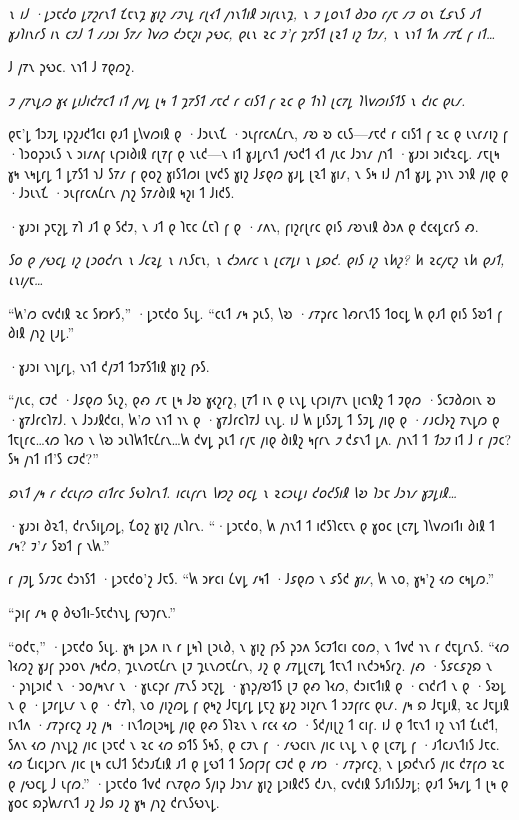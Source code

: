 \emph{𐑯 𐑦𐑓 ·𐑛𐑮𐑱𐑒𐑴 𐑛𐑳𐑟𐑩𐑯𐑑 𐑗𐑱𐑯𐑡 𐑣𐑦𐑟 𐑥𐑲𐑯𐑛 𐑩𐑚𐑬𐑑 𐑢𐑪𐑯𐑑𐑦𐑙 𐑮𐑦𐑝𐑧𐑯𐑡, 𐑯 𐑲 𐑛𐑴𐑯𐑑 𐑔𐑮𐑴 𐑩𐑢𐑱 𐑥𐑲 𐑴𐑯 𐑗𐑭𐑯𐑕 𐑨𐑑 𐑣𐑨𐑐𐑦𐑯𐑩𐑕 𐑦𐑯 𐑤𐑲𐑓 𐑑 𐑥𐑨𐑮𐑦 𐑕𐑳𐑥 𐑐𐑫𐑼 𐑒𐑮𐑱𐑟𐑦 𐑜𐑻𐑤, 𐑞𐑧𐑯 𐑷𐑤 𐑲'𐑝 𐑡𐑳𐑕𐑑 𐑚𐑷𐑑 𐑦𐑟 𐑑𐑲𐑥, 𐑯 𐑯𐑪𐑑 𐑑𐑵 𐑥𐑳𐑗 𐑝 𐑦𐑑…}

𐑓 𐑢𐑳𐑯 𐑜𐑻𐑤. 𐑯𐑪𐑑 𐑓 𐑳𐑞𐑼𐑟.

\emph{𐑲 𐑢𐑳𐑯𐑛𐑼 𐑣𐑬 𐑛𐑦𐑓𐑦𐑒𐑳𐑤𐑑 𐑦𐑑 𐑢𐑫𐑛 𐑚𐑰 𐑑 𐑡𐑳𐑕𐑑 𐑥𐑱𐑒 𐑩 𐑤𐑦𐑕𐑑 𐑝 𐑷𐑤 𐑞 𐑑𐑪𐑐 𐑚𐑤𐑳𐑛 𐑐𐑘𐑫𐑼𐑦𐑕𐑑𐑕 𐑯 𐑒𐑦𐑤 𐑞𐑧𐑥.}

𐑞𐑱'𐑛 𐑑𐑮𐑲𐑛 𐑦𐑜𐑟𐑨𐑒𐑑𐑤𐑦 𐑞𐑨𐑑 𐑛𐑘𐑫𐑼𐑦𐑙 𐑞 ·𐑓𐑮𐑧𐑯𐑗 ·𐑮𐑧𐑝𐑩𐑤𐑵𐑖𐑩𐑯, 𐑥𐑹 𐑹 𐑤𐑧𐑕—𐑥𐑱𐑒 𐑩 𐑤𐑦𐑕𐑑 𐑝 𐑷𐑤 𐑞 𐑧𐑯𐑩𐑥𐑦𐑟 𐑝 ·𐑐𐑮𐑴𐑜𐑮𐑧𐑕 𐑯 𐑮𐑦𐑥𐑵𐑝 𐑧𐑝𐑮𐑦𐑔𐑦𐑙 𐑩𐑚𐑳𐑝 𐑞 𐑯𐑧𐑒—𐑯 𐑦𐑑 𐑣𐑨𐑛𐑩𐑯𐑑 𐑢𐑻𐑒𐑑 𐑬𐑑 𐑢𐑧𐑤 𐑓𐑮𐑪𐑥 𐑢𐑪𐑑 ·𐑣𐑨𐑮𐑦 𐑮𐑦𐑒𐑷𐑤𐑛. 𐑥𐑱𐑚𐑰 𐑣𐑰 𐑯𐑰𐑛𐑩𐑛 𐑑 𐑛𐑳𐑕𐑑 𐑪𐑓 𐑕𐑳𐑥 𐑝 𐑞𐑴𐑟 𐑣𐑦𐑕𐑑𐑼𐑦 𐑚𐑫𐑒𐑕 𐑣𐑦𐑟 𐑓𐑭𐑞𐑼 𐑣𐑨𐑛 𐑚𐑷𐑑 𐑣𐑦𐑥, 𐑯 𐑕𐑰 𐑦𐑓 𐑢𐑪𐑑 𐑣𐑨𐑛 𐑜𐑪𐑯 𐑮𐑪𐑙 𐑢𐑦𐑞 𐑞 ·𐑓𐑮𐑧𐑯𐑗 ·𐑮𐑧𐑝𐑩𐑤𐑵𐑖𐑩𐑯 𐑢𐑪𐑟 𐑕𐑳𐑥𐑔𐑦𐑙 𐑰𐑟𐑦 𐑑 𐑓𐑦𐑒𐑕.

·𐑣𐑨𐑮𐑦 𐑜𐑱𐑟𐑛 𐑳𐑐 𐑨𐑑 𐑞 𐑕𐑒𐑲, 𐑯 𐑨𐑑 𐑞 𐑐𐑱𐑤 𐑖𐑱𐑐 𐑝 𐑞 ·𐑥𐑵𐑯, 𐑝𐑦𐑟𐑩𐑚𐑩𐑤 𐑞𐑦𐑕 𐑥𐑹𐑯𐑦𐑙 𐑔𐑮𐑵 𐑞 𐑒𐑤𐑬𐑛𐑤𐑩𐑕 𐑺.

\emph{𐑕𐑴 𐑞 𐑢𐑻𐑤𐑛 𐑦𐑟 𐑚𐑮𐑴𐑒𐑩𐑯 𐑯 𐑓𐑤𐑷𐑛 𐑯 𐑦𐑯𐑕𐑱𐑯, 𐑯 𐑒𐑮𐑵𐑩𐑤 𐑯 𐑚𐑤𐑳𐑛𐑦 𐑯 𐑛𐑸𐑒. 𐑞𐑦𐑕 𐑦𐑟 𐑯𐑿𐑟? 𐑿 𐑷𐑤𐑢𐑱𐑟 𐑯𐑿 𐑞𐑨𐑑, 𐑧𐑯𐑦𐑢𐑱…}

“𐑿'𐑼 𐑤𐑫𐑒𐑦𐑙 𐑷𐑤 𐑕𐑽𐑾𐑕,” ·𐑛𐑮𐑱𐑒𐑴 𐑕𐑧𐑛. “𐑤𐑧𐑑 𐑥𐑰 𐑜𐑧𐑕, 𐑘𐑹 ·𐑥𐑳𐑜𐑩𐑤 𐑐𐑺𐑩𐑯𐑑𐑕 𐑑𐑴𐑤𐑛 𐑿 𐑞𐑨𐑑 𐑞𐑦𐑕 𐑕𐑹𐑑 𐑝 𐑔𐑦𐑙 𐑢𐑪𐑟 𐑚𐑨𐑛.”

·𐑣𐑨𐑮𐑦 𐑯𐑪𐑛𐑩𐑛, 𐑯𐑪𐑑 𐑒𐑢𐑲𐑑 𐑑𐑮𐑳𐑕𐑑𐑦𐑙 𐑣𐑦𐑟 𐑝𐑶𐑕.

“𐑢𐑧𐑤, 𐑤𐑲𐑒 ·𐑓𐑭𐑞𐑼 𐑕𐑧𐑟, 𐑞𐑺 𐑥𐑱 𐑚𐑰 𐑓𐑹 𐑣𐑬𐑟𐑩𐑟, 𐑚𐑳𐑑 𐑦𐑯 𐑞 𐑧𐑯𐑛 𐑧𐑝𐑮𐑦𐑢𐑳𐑯 𐑚𐑦𐑤𐑪𐑙𐑟 𐑑 𐑲𐑞𐑼 ·𐑕𐑤𐑲𐑔𐑼𐑦𐑯 𐑹 ·𐑣𐑳𐑓𐑩𐑤𐑐𐑳𐑓. 𐑯 𐑓𐑮𐑨𐑙𐑒𐑤𐑦, 𐑿'𐑼 𐑯𐑪𐑑 𐑪𐑯 𐑞 ·𐑣𐑳𐑓𐑩𐑤𐑐𐑳𐑓 𐑧𐑯𐑛. 𐑦𐑓 𐑿 𐑛𐑦𐑕𐑲𐑛 𐑑 𐑕𐑲𐑛 𐑢𐑦𐑞 𐑞 ·𐑥𐑨𐑤𐑓𐑶𐑟 𐑳𐑯𐑛𐑼 𐑞 𐑑𐑱𐑚𐑩𐑤…𐑬𐑼 𐑐𐑬𐑼 𐑯 𐑘𐑹 𐑮𐑧𐑐𐑿𐑑𐑱𐑖𐑩𐑯…𐑿 𐑒𐑫𐑛 𐑜𐑧𐑑 𐑩𐑢𐑱 𐑢𐑦𐑞 𐑔𐑦𐑙𐑟 𐑰𐑝𐑩𐑯 \emph{𐑲} 𐑒𐑭𐑯𐑑 𐑛𐑵. 𐑢𐑪𐑯𐑑 𐑑 \emph{𐑑𐑮𐑲} 𐑦𐑑 𐑓 𐑩 𐑢𐑲𐑤? 𐑕𐑰 𐑢𐑪𐑑 𐑦𐑑'𐑕 𐑤𐑲𐑒?”

\emph{𐑸𐑯𐑑 𐑢𐑰 𐑩 𐑒𐑤𐑧𐑝𐑼 𐑤𐑦𐑑𐑩𐑤 𐑕𐑻𐑐𐑩𐑯𐑑. 𐑦𐑤𐑧𐑝𐑩𐑯 𐑘𐑽𐑟 𐑴𐑤𐑛 𐑯 𐑷𐑤𐑮𐑧𐑛𐑦 𐑒𐑴𐑒𐑕𐑦𐑙 𐑘𐑹 𐑐𐑮𐑱 𐑓𐑮𐑪𐑥 𐑣𐑲𐑛𐑦𐑙…}

·𐑣𐑨𐑮𐑦 𐑔𐑷𐑑, 𐑒𐑩𐑯𐑕𐑦𐑛𐑼𐑛, 𐑗𐑴𐑟 𐑣𐑦𐑟 𐑢𐑧𐑐𐑩𐑯. “·𐑛𐑮𐑱𐑒𐑴, 𐑿 𐑢𐑪𐑯𐑑 𐑑 𐑦𐑒𐑕𐑐𐑤𐑱𐑯 𐑞 𐑣𐑴𐑤 𐑚𐑤𐑳𐑛 𐑐𐑘𐑫𐑼𐑦𐑑𐑦 𐑔𐑦𐑙 𐑑 𐑥𐑰? 𐑲'𐑥 𐑕𐑹𐑑 𐑝 𐑯𐑿.”

𐑩 𐑢𐑲𐑛 𐑕𐑥𐑲𐑤 𐑒𐑮𐑪𐑕𐑑 ·𐑛𐑮𐑱𐑒𐑴'𐑟 𐑓𐑱𐑕. “𐑿 𐑮𐑾𐑤𐑦 𐑖𐑫𐑛 𐑥𐑰𐑑 ·𐑓𐑭𐑞𐑼 𐑯 𐑭𐑕𐑒 \emph{𐑣𐑦𐑥}, 𐑿 𐑯𐑴, 𐑣𐑰'𐑟 𐑬𐑼 𐑤𐑰𐑛𐑼.”

“𐑜𐑦𐑝 𐑥𐑰 𐑞 𐑔𐑻𐑑𐑦-𐑕𐑱𐑒𐑪𐑯𐑛 𐑝𐑻𐑠𐑩𐑯.”

“𐑴𐑒𐑱,” ·𐑛𐑮𐑱𐑒𐑴 𐑕𐑧𐑛. 𐑣𐑰 𐑛𐑮𐑵 𐑦𐑯 𐑩 𐑛𐑰𐑐 𐑚𐑮𐑧𐑔, 𐑯 𐑣𐑦𐑟 𐑝𐑶𐑕 𐑜𐑮𐑵 𐑕𐑤𐑲𐑑𐑤𐑦 𐑤𐑴𐑼, 𐑯 𐑑𐑫𐑒 𐑪𐑯 𐑩 𐑒𐑱𐑛𐑩𐑯𐑕. “𐑬𐑼 𐑐𐑬𐑼𐑟 𐑣𐑨𐑝 𐑜𐑮𐑴𐑯 𐑢𐑰𐑒𐑼, 𐑡𐑧𐑯𐑼𐑱𐑖𐑩𐑯 𐑚𐑲 𐑡𐑧𐑯𐑼𐑱𐑖𐑩𐑯, 𐑨𐑟 𐑞 𐑥𐑳𐑛𐑚𐑤𐑳𐑛 𐑑𐑱𐑯𐑑 𐑦𐑯𐑒𐑮𐑰𐑕𐑩𐑟. 𐑢𐑺 ·𐑕𐑭𐑤𐑭𐑟𐑸 𐑯 ·𐑜𐑪𐑛𐑮𐑦𐑒 𐑯 ·𐑮𐑴𐑢𐑰𐑯𐑩 𐑯 ·𐑣𐑧𐑤𐑜𐑩 𐑢𐑳𐑯𐑕 𐑮𐑱𐑟𐑛 ·𐑣𐑪𐑜𐑢𐑹𐑑𐑕 𐑚𐑲 𐑞𐑺 𐑐𐑬𐑼, 𐑒𐑮𐑦𐑱𐑑𐑦𐑙 𐑞 ·𐑤𐑪𐑒𐑩𐑑 𐑯 𐑞 ·𐑕𐑹𐑛 𐑯 𐑞 ·𐑛𐑲𐑩𐑛𐑧𐑥 𐑯 𐑞 ·𐑒𐑳𐑐, 𐑯𐑴 𐑢𐑦𐑟𐑼𐑛 𐑝 𐑞𐑰𐑟 𐑓𐑱𐑛𐑩𐑛 𐑛𐑱𐑟 𐑣𐑨𐑟 𐑮𐑦𐑟𐑩𐑯 𐑑 𐑮𐑲𐑝𐑩𐑤 𐑞𐑧𐑥. 𐑢𐑰 𐑸 𐑓𐑱𐑛𐑦𐑙, 𐑷𐑤 𐑓𐑱𐑛𐑦𐑙 𐑦𐑯𐑑𐑵 ·𐑥𐑳𐑜𐑩𐑤𐑟 𐑨𐑟 𐑢𐑰 ·𐑦𐑯𐑑𐑼𐑚𐑮𐑰𐑛 𐑢𐑦𐑞 𐑞𐑺 𐑕𐑐𐑷𐑯 𐑯 𐑩𐑤𐑬 𐑬𐑼 ·𐑕𐑒𐑢𐑦𐑚𐑟 𐑑 𐑤𐑦𐑝. 𐑦𐑓 𐑞 𐑑𐑱𐑯𐑑 𐑦𐑟 𐑯𐑪𐑑 𐑗𐑧𐑒𐑑, 𐑕𐑵𐑯 𐑬𐑼 𐑢𐑪𐑯𐑛𐑟 𐑢𐑦𐑤 𐑚𐑮𐑱𐑒 𐑯 𐑷𐑤 𐑬𐑼 𐑸𐑑𐑕 𐑕𐑰𐑕, 𐑞 𐑤𐑲𐑯 𐑝 ·𐑥𐑻𐑤𐑦𐑯 𐑢𐑦𐑤 𐑧𐑯𐑛 𐑯 𐑞 𐑚𐑤𐑳𐑛 𐑝 ·𐑨𐑑𐑤𐑨𐑯𐑑𐑦𐑕 𐑓𐑱𐑤. 𐑬𐑼 𐑗𐑦𐑤𐑛𐑮𐑩𐑯 𐑢𐑦𐑤 𐑚𐑰 𐑤𐑧𐑓𐑑 𐑕𐑒𐑮𐑨𐑗𐑦𐑙 𐑨𐑑 𐑞 𐑛𐑻𐑑 𐑑 𐑕𐑼𐑝𐑲𐑝 𐑤𐑲𐑒 𐑞 𐑥𐑽 ·𐑥𐑳𐑜𐑩𐑤𐑟, 𐑯 𐑛𐑸𐑒𐑯𐑩𐑕 𐑢𐑦𐑤 𐑒𐑳𐑝𐑼 𐑷𐑤 𐑞 𐑢𐑻𐑤𐑛 𐑓 𐑧𐑝𐑼.” ·𐑛𐑮𐑱𐑒𐑴 𐑑𐑫𐑒 𐑩𐑯𐑳𐑞𐑼 𐑕𐑢𐑦𐑜 𐑓𐑮𐑪𐑥 𐑣𐑦𐑟 𐑛𐑮𐑦𐑙𐑒𐑕 𐑒𐑨𐑯, 𐑤𐑫𐑒𐑦𐑙 𐑕𐑨𐑑𐑦𐑕𐑓𐑲𐑛; 𐑞𐑨𐑑 𐑕𐑰𐑥𐑛 𐑑 𐑚𐑰 𐑞 𐑣𐑴𐑤 𐑸𐑜𐑿𐑥𐑩𐑯𐑑 𐑨𐑟 𐑓𐑸 𐑨𐑟 𐑣𐑰 𐑢𐑪𐑟 𐑒𐑩𐑯𐑕𐑻𐑯𐑛.

